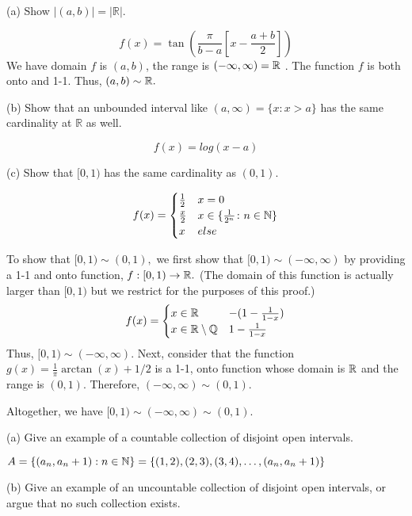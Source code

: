 \documentclass{report}
\begin{document}
(a) Show $|(a, b)|=|\mathbb{R}|$. 


\sol
$$
f(x) = \tan\left(\frac{\pi}{b-a}\left[x - \frac{a+b}{2}\right]\right)
$$
We have domain $f$ is $(a,b)$, the range is $(-\infty, \infty) = \RR$ . The function $f$ is both onto and 1-1. Thus, $(a,b) \sim \RR.$

\par \bigskip
(b) Show that an unbounded interval like $(a, \infty)=\{x: x>a\}$ has the same cardinality at $\mathbb{R}$ as well.

\sol
$$
f(x)=log(x-a)
$$

\par \bigskip
(c) Show that $[0,1)$ has the same cardinality as $(0,1)$. 



\sol


$$ f(x) = 
  \begin{cases} 
    \frac{1}{2} & x= 0 \\
    \frac{x}{2} &  x \in \{ \frac{1}{2^n} \colon n \in \NN \} \\
    x & else
   \end{cases}
$$

    
To show that $[0,1) \sim (0,1),$ we first show that $[0,1) \sim (-\infty, \infty)$ by providing a 1-1 and onto function, $f: [0,1) \rightarrow \RR.$ (The domain of this function is actually larger than $[0,1)$ but we restrict for the purposes of this proof.)
$$ f(x) = 
  \begin{cases} 
  x \in \RR & -(1- \frac{1}{1-x}) \\
  x \in \RR \setminus \QQ & 1- \frac{1}{1-x}
   \end{cases}
$$
Thus, $[0,1) \sim (-\infty, \infty)$. Next, consider that the function $g(x)= \frac{1}{\pi}\arctan(x) + 1/2$ is a 1-1, onto function whose domain is $\RR$ and the range is $(0,1).$ Therefore, $(-\infty, \infty) \sim (0,1).$
\par
Altogether, we have $[0,1) \sim (-\infty, \infty) \sim (0,1).$

\sol


 (a) Give an example of a countable collection of disjoint open intervals.
\par \bigskip

$A=\{(a_n,a_n+1): n \in \NN\} = \{(1,2),(2,3),(3,4),\dots,(a_n,a_n+1)\}$

\par \bigskip

 (b) Give an example of an uncountable collection of disjoint open intervals, or argue that no such collection exists.
\end{document}
